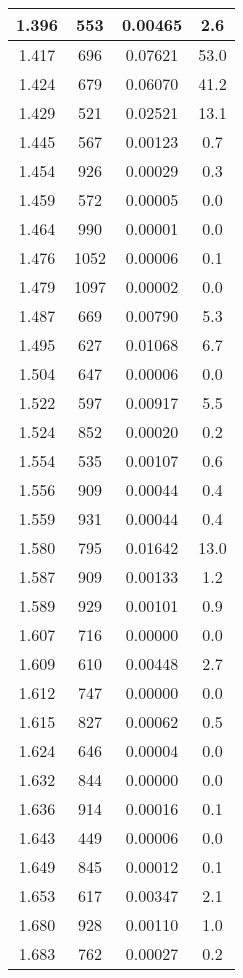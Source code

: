\begin{longtable}{c | c | c | c}
1.396 &  553 & 0.00465 &  2.6 \\ \hline 
1.417 &  696 & 0.07621 & 53.0 \\ \hline 
1.424 &  679 & 0.06070 & 41.2 \\ \hline 
1.429 &  521 & 0.02521 & 13.1 \\ \hline 
1.445 &  567 & 0.00123 &  0.7 \\ \hline 
1.454 &  926 & 0.00029 &  0.3 \\ \hline 
1.459 &  572 & 0.00005 &  0.0 \\ \hline 
1.464 &  990 & 0.00001 &  0.0 \\ \hline 
1.476 & 1052 & 0.00006 &  0.1 \\ \hline 
1.479 & 1097 & 0.00002 &  0.0 \\ \hline 
1.487 &  669 & 0.00790 &  5.3 \\ \hline 
1.495 &  627 & 0.01068 &  6.7 \\ \hline 
1.504 &  647 & 0.00006 &  0.0 \\ \hline 
1.522 &  597 & 0.00917 &  5.5 \\ \hline 
1.524 &  852 & 0.00020 &  0.2 \\ \hline 
1.554 &  535 & 0.00107 &  0.6 \\ \hline 
1.556 &  909 & 0.00044 &  0.4 \\ \hline 
1.559 &  931 & 0.00044 &  0.4 \\ \hline 
1.580 &  795 & 0.01642 & 13.0 \\ \hline 
1.587 &  909 & 0.00133 &  1.2 \\ \hline 
1.589 &  929 & 0.00101 &  0.9 \\ \hline 
1.607 &  716 & 0.00000 &  0.0 \\ \hline 
1.609 &  610 & 0.00448 &  2.7 \\ \hline 
1.612 &  747 & 0.00000 &  0.0 \\ \hline 
1.615 &  827 & 0.00062 &  0.5 \\ \hline 
1.624 &  646 & 0.00004 &  0.0 \\ \hline 
1.632 &  844 & 0.00000 &  0.0 \\ \hline 
1.636 &  914 & 0.00016 &  0.1 \\ \hline 
1.643 &  449 & 0.00006 &  0.0 \\ \hline 
1.649 &  845 & 0.00012 &  0.1 \\ \hline 
1.653 &  617 & 0.00347 &  2.1 \\ \hline 
1.680 &  928 & 0.00110 &  1.0 \\ \hline 
1.683 &  762 & 0.00027 &  0.2 \\ \hline 

\end{longtable}
